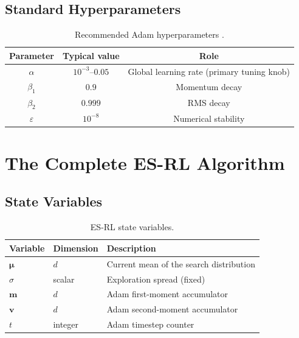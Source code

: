 \documentclass[12pt, a4paper]{article}
\newcommand{\bmu}{\boldsymbol{\mu}}
\newcommand{\mvec}{\mathbf{m}}           %
\newcommand{\vvec}{\mathbf{v}}           %
\begin{document}
\subsection{Standard Hyperparameters}

\begin{table}[ht]
  \centering
  \caption{Recommended Adam hyperparameters \cite{kingma2015}.}
  \label{tab:adam_hyp}
  \begin{tabular}{@{}ccc@{}}
    \toprule
    \textbf{Parameter} & \textbf{Typical value} & \textbf{Role} \\
    \midrule
    $\alpha$      & $10^{-3}$--$0.05$ & Global learning rate (primary tuning knob) \\
    $\beta_1$     & $0.9$             & Momentum decay \\
    $\beta_2$     & $0.999$           & RMS decay \\
    $\varepsilon$ & $10^{-8}$         & Numerical stability \\
    \bottomrule
  \end{tabular}
\end{table}

\section{The Complete ES-RL Algorithm}
\label{sec:algorithm}

\subsection{State Variables}

\begin{table}[ht]
  \centering
  \caption{ES-RL state variables.}
  \begin{tabular}{@{}lll@{}}
    \toprule
    \textbf{Variable} & \textbf{Dimension} & \textbf{Description} \\
    \midrule
    $\bmu$       & $d$     & Current mean of the search distribution \\
    $\sigma$     & scalar  & Exploration spread (fixed) \\
    $\mvec$      & $d$     & Adam first-moment accumulator \\
    $\vvec$      & $d$     & Adam second-moment accumulator \\
    $t$          & integer & Adam timestep counter \\
    \bottomrule
  \end{tabular}
\end{table}
\end{document}
